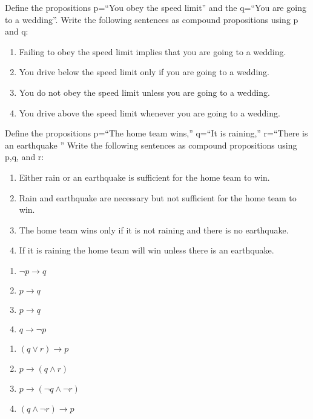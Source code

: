 \documentclass[solution, letterpaper]{cs20}
\begin{document}


\subproblem Define the propositions p=``You obey the speed limit'' and the q=``You are going to a wedding''. Write the following sentences as compound propositions using p and q: 
\begin{enumerate}
\item Failing to obey the speed limit implies that you are going to a wedding.
\item You drive below the speed limit only if you are going to a wedding. 
\item You do not obey the speed limit unless you are going to a wedding. 
\item You drive above the speed limit whenever you are going to a wedding. 
\end{enumerate}

\subproblem Define the propositions p=``The home team wins,'' q=``It is raining,'' r=``There is an earthquake '' Write the following sentences as compound propositions using p,q, and r:
\begin{enumerate}
\item Either rain or an earthquake is sufficient for the home team to win. 
\item Rain and earthquake are necessary but not sufficient for the home team to win. 
\item The home team wins only if it is not raining and there is no earthquake.
\item If it is raining the home team will win unless there is an earthquake.  
\end{enumerate}

\begin{solution}

\subsolution
\begin{enumerate}
\item $\neg p \to q$
\item $p \to q$
\item $p \to q$
\item $q \to \neg p$
\end{enumerate}

\subsolution
\begin{enumerate}
\item $(q \lor r) \to p$
\item $p \to (q \land r)$
\item $p \to (\neg q \land \neg r)$
\item $(q \land \neg r) \to p$
\end{enumerate}

\end{solution}
\end{document}
